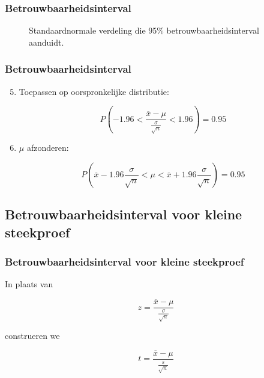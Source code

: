 \documentclass{beamer}
\begin{document}
\begin{frame}
  \frametitle{Betrouwbaarheidsinterval}
  \begin{figure}[t]
\centering
{}
\caption{Standaardnormale verdeling die 95\% betrouwbaarheidsinterval aanduidt.}
\label{fig:verdelingStandaardnormaal}
\end{figure}
\end{frame}

\begin{frame}
  \frametitle{Betrouwbaarheidsinterval}
  
  \begin{enumerate}
    \setcounter{enumi}{4}
    \item Toepassen op oorspronkelijke distributie:
    
    \[ P\left(-1.96 < \frac{\overline{x} - \mu}{\frac{\sigma}{\sqrt{n}}} < 1.96 \right) = 0.95 \]
    
    \item $\mu$ afzonderen:
    
    \[ P\left( \overline{x}-1.96 \frac{\sigma}{\sqrt{n}} < \mu < \overline{x}+1.96 \frac{\sigma}{\sqrt{n}} \right)  = 0.95 \]
  \end{enumerate}
\end{frame}

\subsection{Betrouwbaarheidsinterval voor kleine steekproef}
\begin{frame}
  \frametitle{Betrouwbaarheidsinterval voor kleine steekproef}
  In plaats van

\[ z = \frac{\overline{x} - \mu}{\frac{\sigma}{\sqrt{n}}} \]

construeren we

\[ t = \frac{\overline{x} - \mu}{\frac{s}{\sqrt{n}}} \]
\end{frame}
\end{document}

